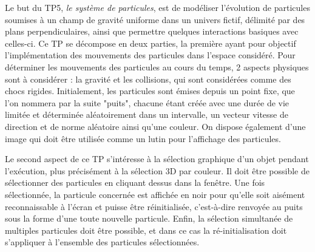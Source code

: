 Le but du TP5, \textit{le système de particules}, est de modéliser l'évolution de particules soumises à un champ de gravité uniforme dans un univers fictif, délimité par des plans perpendiculaires, ainsi que permettre quelques interactions basiques avec celles-ci.
Ce TP se décompose en deux parties, la première ayant pour objectif l'implémentation des mouvements des particules dans l'espace considéré.
Pour déterminer les mouvements des particules au cours du temps, 2 aspects physiques sont à considérer : la gravité et les collisions, qui sont considérées comme des chocs rigides.
Initialement, les particules sont émises depuis un point fixe, que l'on nommera par la suite "puits", chacune étant créée avec une durée de vie limitée et déterminée aléatoirement dans un intervalle, un vecteur vitesse de direction et de norme aléatoire ainsi qu'une couleur.
On dispose également d'une image qui doit être utilisée comme un lutin pour l'affichage des particules.

Le second aspect de ce TP s'intéresse à la sélection graphique d'un objet pendant l'exécution, plus précisément à la sélection 3D par couleur.
Il doit être possible de sélectionner des particules en cliquant dessus dans la fenêtre.
Une fois sélectionnée, la particule concernée est affichée en noir pour qu'elle soit aisément reconnaissable à l'écran et puisse être réinitialisée, c'est-à-dire renvoyée au puits sous la forme d'une toute nouvelle particule.
Enfin, la sélection simultanée de multiples particules doit être possible, et dans ce cas la ré-initialisation doit s'appliquer à l'ensemble des particules sélectionnées.